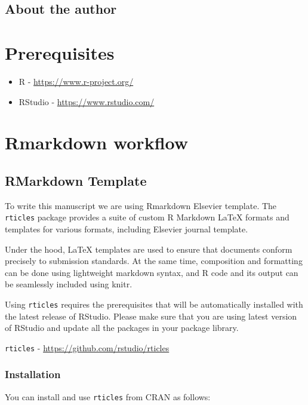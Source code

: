 \documentclass[]{book}
\providecommand{\tightlist}{%
  \setlength{\itemsep}{0pt}\setlength{\parskip}{0pt}}
\begin{document}
\section{About the author}\label{about-the-author}

\chapter{Prerequisites}\label{prerequisites}

\begin{itemize}
\tightlist
\item
  R - \url{https://www.r-project.org/}
\item
  RStudio - \url{https://www.rstudio.com/}
\end{itemize}

\chapter{Rmarkdown workflow}\label{rmarkdown-workflow}

\section{RMarkdown Template}\label{rmarkdown-template}

To write this manuscript we are using Rmarkdown Elsevier template. The
\texttt{rticles} package provides a suite of custom R Markdown LaTeX
formats and templates for various formats, including Elsevier journal
template.

Under the hood, LaTeX templates are used to ensure that documents
conform precisely to submission standards. At the same time, composition
and formatting can be done using lightweight markdown syntax, and R code
and its output can be seamlessly included using knitr.

Using \texttt{rticles} requires the prerequisites that will be
automatically installed with the latest release of RStudio. Please make
sure that you are using latest version of RStudio and update all the
packages in your package library.

\texttt{rticles} - \url{https://github.com/rstudio/rticles}

\subsection{Installation}\label{installation}

You can install and use \texttt{rticles} from CRAN as follows:
\end{document}
